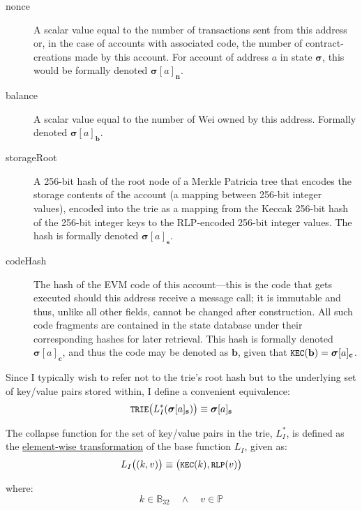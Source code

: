 \documentclass[9pt,oneside]{amsart}
\begin{document}
\begin{multicols}{2}
\begin{description}
\hypertarget{account nonce}{}
\item[nonce] A scalar value equal to the number of transactions sent from this address or, in the case of accounts with associated code, the number of contract-creations made by this account. For account of address $a$ in state $\boldsymbol{\sigma}$, this would be formally denoted $\boldsymbol{\sigma}[a]_\mathbf{n}$.
\item[balance] A scalar value equal to the number of Wei owned by this address. Formally denoted $\boldsymbol{\sigma}[a]_\mathbf{b}$.
\item[storageRoot] A 256-bit hash of the root node of a Merkle Patricia tree that encodes the storage contents of the account (a mapping between 256-bit integer values), encoded into the trie as a mapping from the Keccak 256-bit hash of the  256-bit integer keys to the RLP-encoded 256-bit integer values. The hash is formally denoted $\boldsymbol{\sigma}[a]_\mathbf{s}$.
\item[codeHash] The hash of the EVM code of this account---this is the code that gets executed should this address receive a message call; it is immutable and thus, unlike all other fields, cannot be changed after construction. All such code fragments are contained in the state database under their corresponding hashes for later retrieval. This hash is formally denoted $\boldsymbol{\sigma}[a]_\mathbf{c}$, and thus the code may be denoted as $\mathbf{b}$, given that $\texttt{\small KEC}(\mathbf{b}) = \boldsymbol{\sigma}[a]_\mathbf{c}$.
\end{description}

Since I typically wish to refer not to the trie's root hash but to the underlying set of key/value pairs stored within, I define a convenient equivalence:
\begin{equation}
\texttt{\small TRIE}\big(L_I^*(\boldsymbol{\sigma}[a]_\mathbf{s})\big) \equiv \boldsymbol{\sigma}[a]_\mathbf{s}
\end{equation}

The collapse function for the set of key/value pairs in the trie, $L_I^*$, is defined as the \hyperlink{f*}{element-wise transformation} of the base function $L_I$, given as:
\begin{equation}
L_I\big( (k, v) \big) \equiv \big(\texttt{\small KEC}(k), \texttt{\small RLP}(v)\big)
\end{equation}

where:
\begin{equation}
k \in \mathbb{B}_{32} \quad \wedge \quad v \in \mathbb{P}
\end{equation}


\end{multicols}
\end{document}
